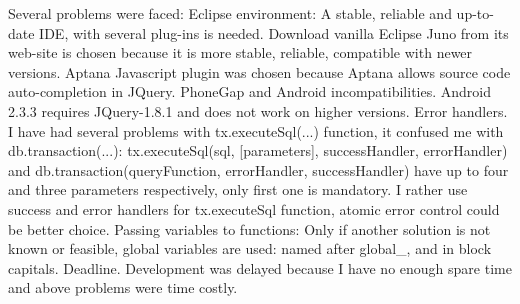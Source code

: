 Several problems were faced:
Eclipse environment: A stable, reliable and up-to-date IDE, with several plug-ins is needed. Download vanilla Eclipse Juno from its web-site is chosen because it is more stable, reliable, compatible with newer versions.  Aptana Javascript plugin was chosen because Aptana allows source code auto-completion in JQuery.
PhoneGap and Android incompatibilities. Android 2.3.3 requires JQuery-1.8.1 and does not work on higher versions. 
Error handlers. I have had several problems with tx.executeSql(...) function, it confused me with db.transaction(...): 
tx.executeSql(sql, [parameters],  successHandler, errorHandler)
and
db.transaction(queryFunction, errorHandler, successHandler)  
have up to four and three parameters respectively, only first one is mandatory. I rather use success and error handlers for tx.executeSql function, atomic error control could be better choice.
Passing variables to functions: Only if another solution is not known or feasible, global variables are used: named after global\_\*, and in block capitals.
Deadline. Development was delayed because I have no enough spare time and above problems were time costly.

